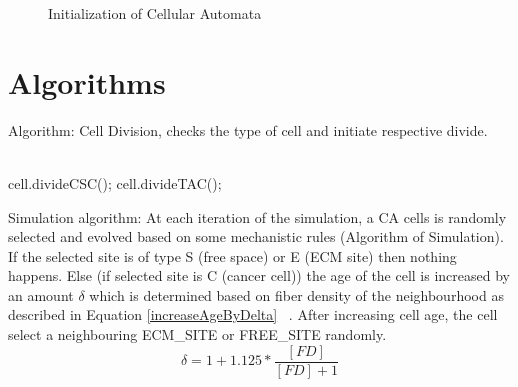   \begin{figure}[H]
	  \centering
	  \caption{Initialization of Cellular Automata}
	  \label{Initialization}
  \end{figure}

\section{Algorithms}

\noindent Algorithm: Cell Division, checks the type of cell and initiate respective divide.\\\

\begin{algorithm}[H]
     \SetAlgoLined
     
	\begin{algorithmic}
		\STATE cell.divideCSC();
		\STATE cell.divideTAC();
	      \ENDIF
	\end{algorithmic}
		    
\end{algorithm}


\noindent Simulation algorithm: At each iteration of the simulation, 
a CA cells is randomly selected and evolved based on some mechanistic rules (Algorithm of Simulation). 
If the selected site is of type S (free space) or E (ECM site) then nothing happens. 
Else (if selected site is C (cancer cell)) the age of the cell is increased by an amount $\delta$ which is determined based on 
fiber density of the neighbourhood as described in Equation \ref{increaseAgeByDelta} ~\cite{klein2009, ulrich2009}. 
After increasing cell age, the cell select a neighbouring ECM\_SITE or FREE\_SITE randomly. 
\begin{equation}
 \delta =  1 + 1.125 *  \frac{[FD]}{[FD]+1}
 \label{increaseAgeByDelta}
\end{equation}


